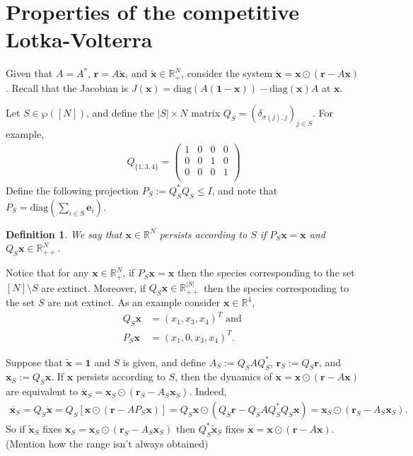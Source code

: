 \documentclass{article}
\newcommand{\R}{\mathbb{R}}
\newtheorem{define}[thm]{Definition}
\renewcommand{\d}{\delta}
\newcommand{\1}{\mathbf{1}}
\newcommand{\0}{\mathbf{0}}
\newcommand{\x}{{\mathbf {{x}}}}
\newcommand{\e}{{\mathbf {{e}}}}
\newcommand{\cp}{{\mathbf {{r}}}}
\newcommand{\diag}{\mathrm{diag}}
\begin{document}
\section{Properties of the competitive Lotka-Volterra}
Given that $A = A^*$, $\cp = A \tilde{\x}$, and $\tilde{\x} \in \R_+^N$, consider the system $\dot{\x} = \x \odot (\cp - A \x)$.  Recall that the Jacobian is $J(\x) = \diag(A(\1 - \x)) - \diag(\x) A$ at $\x$.

Let $S \in \wp([N])$, and define the $|S| \times N$ matrix $Q_S = (\d_{\sigma(j),j})_{j \in S}$.  For example, 
\begin{align*} 
Q_{\{1,3,4\}} = 
\begin{pmatrix} 
1 & 0 & 0 & 0 \\
0 & 0 & 1 & 0 \\
0 & 0 & 0 & 1 \\
\end{pmatrix} 
\end{align*}
Define the following projection $P_S := Q_S^* Q_S \le I$, and note that $P_S = \diag( \sum_{i \in S} \e_i)$.  
\begin{define}
We say that $\x \in \R^N$ persists according to $S$ if $P_S \x = \x$ and $Q_S \x \in \R_{++}^N$.
\end{define}
Notice that for any $\x \in \R_+^N$, if $P_S \x = \x$ then the species corresponding to the set $[N] \setminus S$ are extinct. 
Moreover, if $Q_S \x \in \R_{++}^{|S|}$ then the species corresponding to the set $S$ are not extinct.
As an example consider $\x \in \R^4$,
\begin{align*} 
Q_S \x &= (x_1,x_3,x_4)^T \mbox{ and }\\
P_S \x &= (x_1,0,x_3,x_4)^T.
\end{align*}

Suppose that $\tilde{\x} = \1$ and $S$ is given, and define $A_S := Q_SA Q_S^*$, $\cp_S := Q_S \cp$, and $\x_S := Q_S \x$.
If $\x$ persists according to $S$, then the dynamics of $\dot{\x} = \x \odot (\cp - A \x)$ are equivalent to $\dot{\x}_S = \x_S \odot (\cp_S - A_S \x_S)$.
Indeed, 
\begin{align} \label{sub_dyn}
\dot{\x_S} = Q_S \dot{\x} = Q_S [\x \odot (\cp - A P_S \x)] = Q_S \x \odot (Q_S \cp - Q_SA Q_S^* Q_S \x) = \x_S \odot (\cp_S - A_S \x_S).
\end{align}
So if $\tilde \x_S$ fixes $\dot{\x}_S = \x_S \odot (\cp_S - A_S \x_S)$ then $Q_S^* \tilde \x_S$ fixes $\dot{\x} = \x \odot (\cp - A \x)$.
(Mention how the range isn't always obtained)
\end{document}
